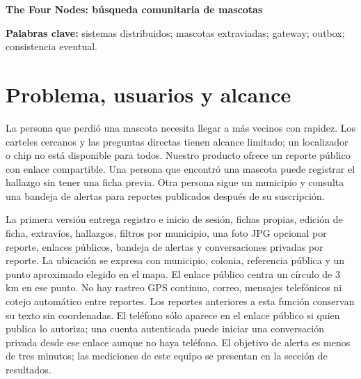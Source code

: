 \documentclass[11pt,letterpaper]{article}
\begin{document}
\hacerportada
\begin{center}
{\Large\bfseries The Four Nodes: búsqueda comunitaria de mascotas\par}
\vspace{0.2em}{\small Proyecto final de Sistemas Distribuidos, FI-UNAM\par}
\end{center}
\begin{abstract}
Cuando se extravía una mascota, su dueño suele colocar carteles y preguntar en la zona. La información llega a pocas personas y los posibles hallazgos quedan dispersos. Desarrollamos una aplicación web para registrar mascotas, publicar extravíos y hallazgos con ubicación textual y un punto aproximado en el mapa, avisar a quienes siguen un municipio y permitir que un testigo escriba al autor del reporte sin necesitar un teléfono público. El prototipo separa identidad, reportes y alertas en procesos; Traefik distribuye las solicitudes de reportes entre dos réplicas. El reporte y su evento se guardan juntos; la alerta se crea después mediante un trabajador que consulta eventos pendientes y confirma su procesamiento. La base de datos es una instancia PostgreSQL con tres bases lógicas, por lo que su caída afecta al sistema completo. Este documento describe el alcance realmente implementado, las decisiones y las pruebas locales, con sus límites.
\end{abstract}
\textbf{Palabras clave:} sistemas distribuidos; mascotas extraviadas; gateway; outbox; consistencia eventual.

\section{Problema, usuarios y alcance}
La persona que perdió una mascota necesita llegar a más vecinos con rapidez. Los carteles cercanos y las preguntas directas tienen alcance limitado; un localizador o chip no está disponible para todos. Nuestro producto ofrece un reporte público con enlace compartible. Una persona que encontró una mascota puede registrar el hallazgo sin tener una ficha previa. Otra persona sigue un municipio y consulta una bandeja de alertas para reportes publicados después de su suscripción.

La primera versión entrega registro e inicio de sesión, fichas propias, edición de ficha, extravíos, hallazgos, filtros por municipio, una foto JPG opcional por reporte, enlaces públicos, bandeja de alertas y conversaciones privadas por reporte. La ubicación se expresa con municipio, colonia, referencia pública y un punto aproximado elegido en el mapa. El enlace público centra un círculo de 3 km en ese punto. No hay rastreo GPS continuo, correo, mensajes telefónicos ni cotejo automático entre reportes. Los reportes anteriores a esta función conservan su texto sin coordenadas. El teléfono sólo aparece en el enlace público si quien publica lo autoriza; una cuenta autenticada puede iniciar una conversación privada desde ese enlace aunque no haya teléfono. El objetivo de alerta es menos de tres minutos; las mediciones de este equipo se presentan en la sección de resultados.
\end{document}
